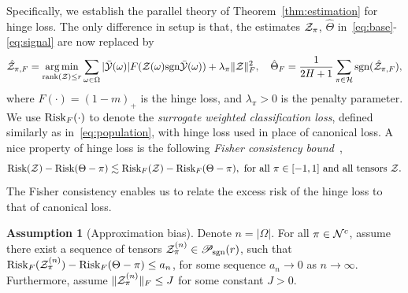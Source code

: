 \documentclass[twoside,11pt]{article}
\theoremstyle{definition}
\newtheorem{assumption}{Assumption}
\def\sign{\textup{sgn}}
\def\rank{\textup{rank}}
\def\caliP{\mathscr{P}_{\textup{sgn}}}
\def\risk{\textup{Risk}}
\begin{document}
Specifically, we establish the parallel theory of Theorem~\ref{thm:estimation} for hinge loss. The only difference in setup is that, the estimates $\mathcal{Z}_\pi$, $\hat \Theta$ in~\eqref{eq:base}-\eqref{eq:signal} are now replaced by
\begin{align}\label{eq:hingeest}
\hat \tZ_{\pi,F}= \argmin_{\rank(\tZ)\leq r}\sum_{\omega\in \Omega} |\bar \tY(\omega)|F(\tZ(\omega)\sign\bar \tY(\omega))+\lambda_\pi \FnormSize{}{\tZ}^2,\quad \hat \Theta_F={1\over 2H+1}\sum_{\pi \in \tH}\sign(\hat \tZ_{\pi,F}),
\end{align} 
where $F(\cdot)=(1-m)_{+}$ is the hinge loss, and $\lambda_\pi>0$ is the penalty parameter. We use $\risk_F(\cdot)$ to denote the \emph{surrogate weighted classification loss}, defined similarly as in~\eqref{eq:population}, with hinge loss used in place of canonical loss. A nice property of hinge loss is the following \emph{Fisher consistency bound}~\citep{scott2011surrogate},
\begin{equation} \label{eq:fisher}
\risk(\tZ)-\risk(\Theta-\pi)\lesssim \risk_{F}(\tZ)-\risk_{F}(\Theta-\pi), \text{ for all $\pi\in[-1,1]$ and all tensors $\tZ$}.
\end{equation}
The Fisher consistency enables us to relate the excess risk of the hinge loss to that of canonical loss.

\begin{assumption}[Approximation bias]\label{ass:loss} 
Denote $n=|\Omega|$. For all $\pi\in\mathcal{N}^c$, assume there exist a sequence of tensors $\tZ^{(n)}_\pi\in\caliP(r)
$, such that $\risk_F(\tZ^{(n)}_\pi)-\risk_F(\Theta-\pi)\leq a_n$, for some sequence $a_n\to 0$ as $n\to\infty$. Furthermore, assume $\lVert\mathcal{Z}_{\pi}^{(n)}\rVert_F \leq J$ for some constant $J>0$. 
\end{assumption}
\end{document}
